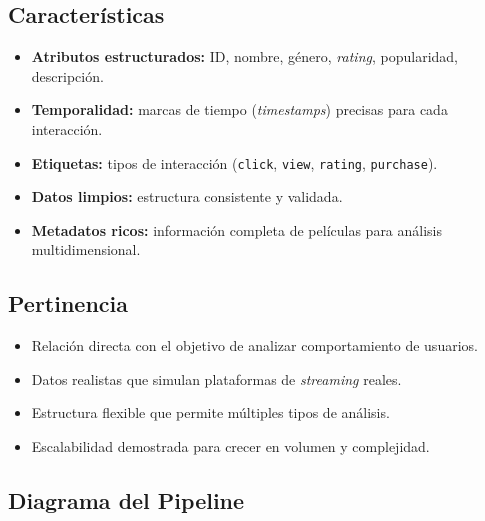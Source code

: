 \documentclass[11pt,a4paper]{article}
\begin{document}
\subsection*{Características}
\begin{itemize}
  \item \textbf{Atributos estructurados:} ID, nombre, género, \textit{rating}, popularidad, descripción.
  \item \textbf{Temporalidad:} marcas de tiempo (\textit{timestamps}) precisas para cada interacción.
  \item \textbf{Etiquetas:} tipos de interacción (\texttt{click}, \texttt{view}, \texttt{rating}, \texttt{purchase}).
  \item \textbf{Datos limpios:} estructura consistente y validada.
  \item \textbf{Metadatos ricos:} información completa de películas para análisis multidimensional.
\end{itemize}

\subsection*{Pertinencia}
\begin{itemize}
  \item Relación directa con el objetivo de analizar comportamiento de usuarios.
  \item Datos realistas que simulan plataformas de \textit{streaming} reales.
  \item Estructura flexible que permite múltiples tipos de análisis.
  \item Escalabilidad demostrada para crecer en volumen y complejidad.
\end{itemize}

\subsection*{Diagrama del Pipeline}
\end{document}
